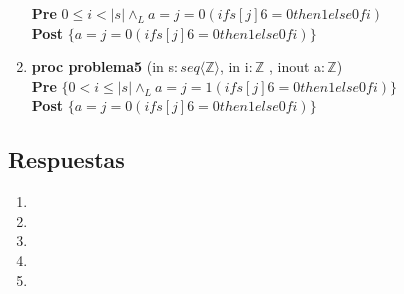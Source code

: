 \documentclass{article}
\begin{document}
\begin{enumerate}[label=\alph*)]
{   \hspace*{6mm} \textbf{Pre }${0 \leq i < |s| \wedge_L a = j=0 (if s[j] 6= 0 
   		then 1 else 0 fi)}$\\
                   
   \hspace*{6mm} \textbf{Post }$\{a = j=0 (if s[j] 6= 0 then 1 else 0 fi)\}$\\
   }

\item \textbf{proc problema5 }(in s$: seq\langle \mathbb{Z}\rangle$, in i$:\mathbb{Z}$
	, inout a$: \mathbb{Z}$) {\\
                                  
    \hspace*{6mm} \textbf{Pre }$\{0 < i \leq |s| \wedge_L a = j=1 (if s[j] 6= 0 
    then 1 else 0 fi)\}$\\
                    
   \hspace*{6mm} \textbf{Post }$\{a = j=0 (if s[j] 6= 0 then 1 else 0 fi)\}$\\
   }                     
\end{enumerate}

\subsection*{Respuestas}

\begin{enumerate}[label=\alph*)]
	\item
	\item
	\item
	\item
	\item
\end{enumerate}
\end{document}
